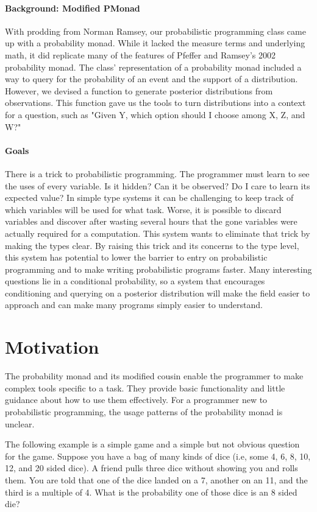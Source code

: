 \documentclass[10pt,twocolumn]{article}
\begin{document}
\paragraph{Background: Modified PMonad}
With prodding from Norman Ramsey, our probabilistic programming class came up with a probability monad. While it lacked the measure terms and underlying math, it did replicate many of the features of Pfeffer and Ramsey's 2002 probability monad. The class' representation of a probability monad included a way to query for the probability of an event and the support of a distribution. However, we devised a function to generate posterior distributions from observations. This function gave us the tools to turn distributions into a context for a question, such as "Given Y, which option should I choose among X, Z, and W?"

\paragraph{Goals}
There is a trick to probabilistic programming. The programmer must learn to see the uses of every variable. Is it hidden? Can it be observed? Do I care to learn its expected value? In simple type systems it can be challenging to keep track of which variables will be used for what task. Worse, it is possible to discard variables and discover after wasting several hours that the gone variables were actually required for a computation. This system wants to eliminate that trick by making the types clear. By raising this trick and its concerns to the type level, this system has potential to lower the barrier to entry on probabilistic programming and to make writing probabilistic programs faster. Many interesting questions lie in a conditional probability, so a system that encourages conditioning and querying on a posterior distribution will make the field easier to approach and can make many programs simply easier to understand.

\section{Motivation}
The probability monad and its modified cousin enable the programmer to make complex tools specific to a task. They provide basic functionality and little guidance about how to use them effectively. For a programmer new to probabilistic programming, the usage patterns of the probability monad is unclear.

The following example is a simple game and a simple but not obvious question for the game. Suppose you have a bag of many kinds of dice (i.e, some 4, 6, 8, 10, 12, and 20 sided dice). A friend pulls three dice without showing you and rolls them. You are told that one of the dice landed on a 7, another on an 11, and the third is a multiple of 4. What is the probability one of those dice is an 8 sided die?
\end{document}
